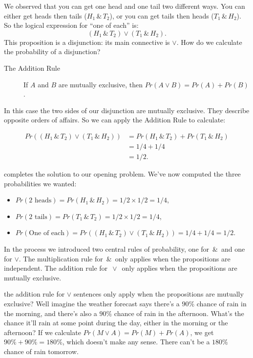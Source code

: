 \documentclass[justified]{tufte-book}
\providecommand{\tightlist}{%
  \setlength{\itemsep}{0pt}\setlength{\parskip}{0pt}}
\theoremstyle{definition}
\theoremstyle{definition}
\theoremstyle{definition}
\theoremstyle{definition}
\theoremstyle{remark}
\begin{document}
We observed that you can get one head and one tail two different ways. You can either get heads then tails (\(H_1 \,\&\, T_2\)), or you can get tails then heads (\(T_1 \,\&\, H_2\)). So the logical expression for ``one of each'' is:
\[ (H_1 \,\&\, T_2) \vee (T_1 \,\&\, H_2). \]
This proposition is a disjunction: its main connective is \(\vee\). How do we calculate the probability of a disjunction?

\begin{description}
\item[The Addition Rule]
If \(A\) and \(B\) are mutually exclusive, then \(Pr(A \vee B) = Pr(A) + Pr(B)\).
\end{description}

In this case the two sides of our disjunction are mutually exclusive. They describe opposite orders of affairs. So we can apply the Addition Rule to calculate:

\[
  \begin{aligned}
    Pr((H_1 \,\&\, T_2) \vee (T_1 \,\&\, H_2)) 
      &= Pr(H_1 \,\&\, T_2) + Pr(T_1 \,\&\, H_2)\\
      &= 1/4 + 1/4\\
      &= 1/2.
  \end{aligned}      
\]

 completes the solution to our opening problem. We've now computed the three probabilities we wanted:

\begin{itemize}
\tightlist
\item
  \(Pr(\mbox{2 heads}) = Pr(H_1 \,\&\, H_2) = 1/2 \times 1/2 = 1/4\),
\item
  \(Pr(\mbox{2 tails}) = Pr(T_1 \,\&\, T_2) = 1/2 \times 1/2 = 1/4\),
\item
  \(Pr(\mbox{One of each}) = Pr((H_1 \,\&\, T_2) \vee (T_1 \,\&\, H_2)) = 1/4 + 1/4 = 1/2\).
\end{itemize}

In the process we introduced two central rules of probability, one for \(\,\&\,\) and one for \(\vee\). The multiplication rule for \(\,\&\,\) only applies when the propositions are independent. The addition rule for \(\,\vee\,\) only applies when the propositions are mutually exclusive.

 the addition rule for \(\vee\) sentences only apply when the propositions are mutually exclusive? Well imagine the weather forecast says there's a \(90\%\) chance of rain in the morning, and there's also a \(90\%\) chance of rain in the afternoon. What's the chance it'll rain at some point during the day, either in the morning or the afternoon? If we calculate \(Pr(M \vee A) = Pr(M) + Pr(A)\), we get \(90\% + 90\% = 180\%\), which doesn't make any sense. There can't be a \(180\%\) chance of rain tomorrow.
\end{document}
